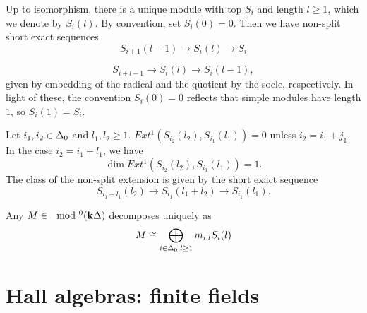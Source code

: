 \documentclass[a4paper, 11pt]{report}
\begin{document}
Up to isomorphism, there is a unique module with top $S_i$ and length $l\geq 1$, which we denote by $S_i(l)$. By convention, set $S_i(0) = 0$. Then we have non-split short exact sequences
\begin{equation*}
S_{i+1}(l-1)\to S_i(l)\to S_i
\end{equation*}

\begin{equation*}
S_{i+l-1}\to S_i(l)\to S_i(l-1),
\end{equation*}
given by embedding of the radical and the quotient by the socle, respectively. In light of these, the convention $S_i(0)=0$ reflects that simple modules have length $1$, so $S_i(1)=S_i$.

\begin{lemma}
Let $i_1,i_2\in\Delta_0$ and $l_1,l_2\geq 1$. $Ext^1(S_{i_2}(l_2), S_{i_1}(l_1))=0$ unless $i_2 = i_1 + j_1$. In the case $i_2 = i_1 + l_1$, we have
\begin{equation*}
\dim Ext^1(S_{i_2}(l_2), S_{i_1}(l_1)) = 1.
\end{equation*}
The class of the non-split extension is given by the short exact sequence
\begin{equation*}
S_{i_1 + l_1}(l_2)\to S_{i_1}(l_1+ l_2) \to S_{i_1}(l_1).
\end{equation*}
\end{lemma}

\begin{lemma}
Any $M\in\mod^0(\mathbf{k}\Delta)$ decomposes uniquely as
\begin{equation*}
M\cong \bigoplus_{i\in\Delta_0; l\geq 1} m_{i,l}S_i(l)
\end{equation*}
\end{lemma}

\section{Hall algebras: finite fields}
\end{document}
